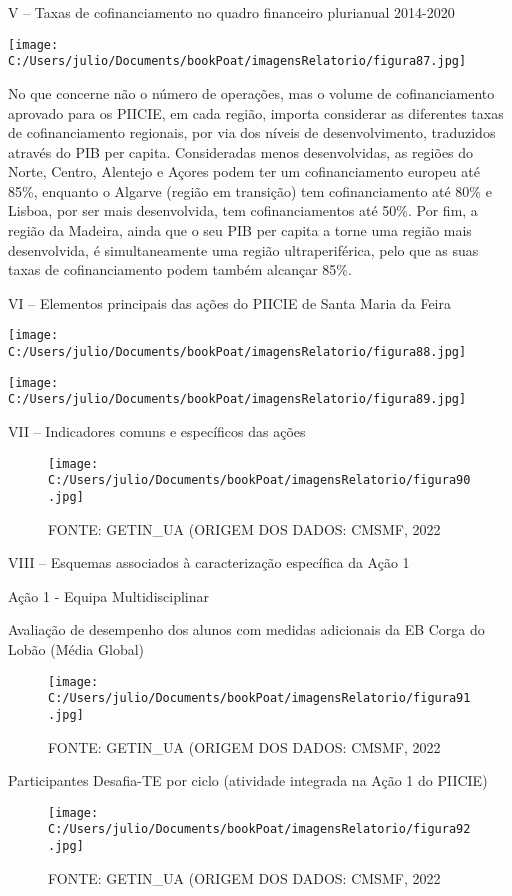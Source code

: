 \documentclass[
]{book}
\begin{document}
V -- Taxas de cofinanciamento no quadro financeiro plurianual 2014-2020

\texttt{[image: C:/Users/julio/Documents/bookPoat/imagensRelatorio/figura87.jpg]}

No que concerne não o número de operações, mas o volume de cofinanciamento aprovado para os PIICIE, em cada região, importa considerar as diferentes taxas de cofinanciamento regionais, por via dos níveis de desenvolvimento, traduzidos através do PIB per capita. Consideradas menos desenvolvidas, as regiões do Norte, Centro, Alentejo e Açores podem ter um cofinanciamento europeu até 85\%, enquanto o Algarve (região em transição) tem cofinanciamento até 80\% e Lisboa, por ser mais desenvolvida, tem cofinanciamentos até 50\%. Por fim, a região da Madeira, ainda que o seu PIB per capita a torne uma região mais desenvolvida, é simultaneamente uma região ultraperiférica, pelo que as suas taxas de cofinanciamento podem também alcançar 85\%.

VI -- Elementos principais das ações do PIICIE de Santa Maria da Feira

\texttt{[image: C:/Users/julio/Documents/bookPoat/imagensRelatorio/figura88.jpg]}

\texttt{[image: C:/Users/julio/Documents/bookPoat/imagensRelatorio/figura89.jpg]}

VII -- Indicadores comuns e específicos das ações

\begin{figure}
\centering
\texttt{[image: C:/Users/julio/Documents/bookPoat/imagensRelatorio/figura90.jpg]}
\caption{FONTE: GETIN\_UA (ORIGEM DOS DADOS: CMSMF, 2022}
\end{figure}

VIII -- Esquemas associados à caracterização específica da Ação 1

Ação 1 - Equipa Multidisciplinar

Avaliação de desempenho dos alunos com medidas adicionais da EB Corga do Lobão (Média Global)

\begin{figure}
\centering
\texttt{[image: C:/Users/julio/Documents/bookPoat/imagensRelatorio/figura91.jpg]}
\caption{FONTE: GETIN\_UA (ORIGEM DOS DADOS: CMSMF, 2022}
\end{figure}

Participantes Desafia-TE por ciclo (atividade integrada na Ação 1 do PIICIE)

\begin{figure}
\centering
\texttt{[image: C:/Users/julio/Documents/bookPoat/imagensRelatorio/figura92.jpg]}
\caption{FONTE: GETIN\_UA (ORIGEM DOS DADOS: CMSMF, 2022}
\end{figure}
\end{document}
